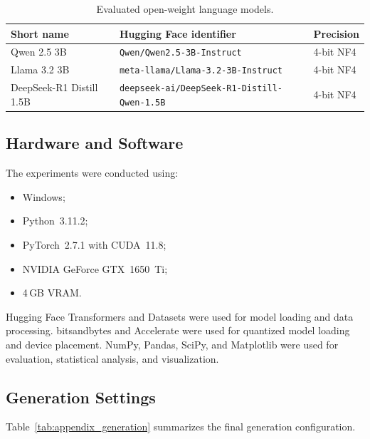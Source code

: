 \documentclass{article}
\begin{document}
\begin{table}[t]
\centering
\small
\caption{Evaluated open-weight language models.}
\label{tab:appendix_models}
\begin{tabular}{lll}
\toprule
\textbf{Short name} &
\textbf{Hugging Face identifier} &
\textbf{Precision} \\
\midrule
Qwen 2.5 3B &
\texttt{Qwen/Qwen2.5-3B-Instruct} &
4-bit NF4 \\

Llama 3.2 3B &
\texttt{meta-llama/Llama-3.2-3B-Instruct} &
4-bit NF4 \\

DeepSeek-R1 Distill 1.5B &
\texttt{deepseek-ai/DeepSeek-R1-Distill-Qwen-1.5B} &
4-bit NF4 \\
\bottomrule
\end{tabular}
\end{table}

\subsection{Hardware and Software}

The experiments were conducted using:

\begin{itemize}
    \item Windows;
    \item Python~3.11.2;
    \item PyTorch~2.7.1 with CUDA~11.8;
    \item NVIDIA GeForce GTX~1650~Ti;
    \item 4\,GB VRAM.
\end{itemize}

Hugging Face Transformers and Datasets were used for model loading and data
processing. bitsandbytes and Accelerate were used for quantized model loading
and device placement. NumPy, Pandas, SciPy, and Matplotlib were used for
evaluation, statistical analysis, and visualization.

\subsection{Generation Settings}

Table~\ref{tab:appendix_generation} summarizes the final generation
configuration.
\end{document}
